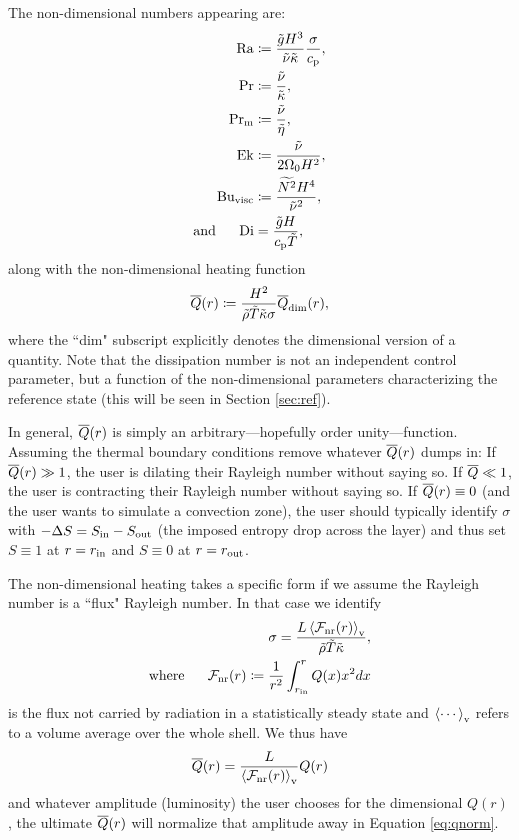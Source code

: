 \documentclass[12pt]{article}
\numberwithin{equation}{section}
\newcommand{\dimm}{_{\rm{dim}}}
\begin{document}
The non-dimensional numbers appearing are:
\begin{subequations}
\begin{align}
	{\rm{Ra}} &\coloneqq \frac{\tilde{g} H^3}{\tilde{\nu} \tilde{\kappa}} \frac{\sigma}{c_{\rm{p}}},\\ 
	{\rm{Pr}} &\coloneqq \frac{\tilde{\nu}}{\tilde{\kappa}},\\
	{\rm{Pr_m}} &\coloneqq \frac{\tilde{\nu}}{\tilde{\eta}},\\
	{\rm{Ek}} &\coloneqq \frac{\tilde{\nu}}{2\Omega_0H^2},\\	
	{\rm{Bu_{visc}}} &\coloneqq \frac{\widetilde{N^2}H^4}{\tilde{\nu}^2},\\
	\text{and}\ \ \ \ \  {\rm{Di}} &= \frac{\tilde{g}H}{c_{\rm{p}}\tilde{T}},
\end{align}
\end{subequations}
along with the non-dimensional heating function
\begin{align}\label{eq:qnd}
	\qref\ofr \define \frac{H^2}{\tilde{\rho}\tilde{T}\tilde{\kappa} \sigma} \qref\dimm\ofr,
\end{align}
where the ``dim" subscript explicitly denotes the dimensional version of a quantity. Note that the dissipation number is not an independent control parameter, but a function of the non-dimensional parameters characterizing the reference state (this will be seen in Section \ref{sec:ref}). 

In general, $\overline{Q}(r)$ is simply an arbitrary---hopefully order unity---function. Assuming the thermal boundary conditions remove whatever $\overline{Q}(r)$ dumps in: If $\overline{Q}(r)\gg1$, the user is dilating their Rayleigh number without saying so. If $\overline{Q}\ll1$, the user is contracting their Rayleigh number without saying so. If $\overline{Q}(r)\equiv0$ (and the user wants to simulate a convection zone), the user should typically identify $\sigma$ with $-\Delta S=S_{\rm{in}}-S_{\rm{out}}$ (the imposed entropy drop across the layer) and thus set $S\equiv1$ at $r=r_{\rm{in}}$ and $S\equiv0$ at $r=r_{\rm{out}}$.
 
The non-dimensional heating takes a specific form if we assume the Rayleigh number is a ``flux" Rayleigh number. In that case we identify
\begin{align}
	\sigma = \frac{L \left\langle{\mathcal{F}}_{\rm{nr}}(r)\right\rangle_{\rm{v}}}{\tilde{\rho}\tilde{T}\tilde{\kappa}},\\
	\text{where}\ \ \ \ \  {\mathcal{F}}_{\rm{nr}}(r) \coloneqq \frac{1}{r^2}\int_{r_{\rm{in}}}^r Q(x) x^2 dx
\end{align}
is the flux not carried by radiation in a statistically steady state and $\left\langle\cdots\right\rangle_{\rm{v}}$ refers to a volume average over the whole shell. We thus have
\begin{align}\label{eq:qnorm}
	\overline{Q}(r) = \frac{L}{\left\langle{\mathcal{F}}_{\rm{nr}}(r)\right\rangle_{\rm{v}}}Q(r)
\end{align}
and whatever amplitude (luminosity) the user chooses for the dimensional $Q(r)$, the ultimate $\overline{Q}(r)$ will normalize that amplitude away in Equation \eqref{eq:qnorm}. 
\end{document}
